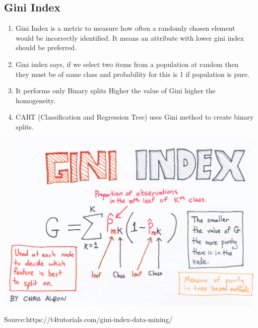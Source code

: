 \documentclass[a0,portrait]{a0poster}
\begin{document}
\begin{multicols}{3}
\subsection*{Gini Index}
\begin{enumerate}
\item  Gini Index is a metric to measure how often a randomly chosen element would be incorrectly identified. It means an attribute with lower gini index should be preferred.
\item Gini index says, if we select two items from a population at random then they must be of same class and probability for this is 1 if population is pure.
\item It performs only Binary splits
Higher the value of Gini higher the homogeneity.
\item CART (Classification and Regression Tree) uses Gini method to create binary splits.
\end{enumerate}
\begin{center}\vspace{1cm}
\includegraphics[width=0.8\linewidth]{Gini_Index_print.png}
\caption*{Source:https://t4tutorials.com/gini-index-data-mining/}
\end{center}\vspace{1cm}

\end{multicols}
\end{document}
